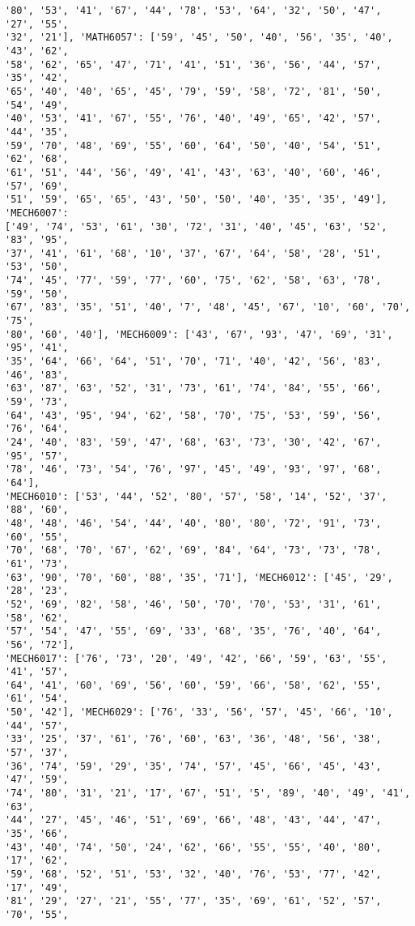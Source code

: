 \documentclass[11pt]{article}
\begin{document}
\begin{Verbatim}[commandchars=\\\{\}]
'80', '53', '41', '67', '44', '78', '53', '64', '32', '50', '47', '27', '55',
'32', '21'], 'MATH6057': ['59', '45', '50', '40', '56', '35', '40', '43', '62',
'58', '62', '65', '47', '71', '41', '51', '36', '56', '44', '57', '35', '42',
'65', '40', '40', '65', '45', '79', '59', '58', '72', '81', '50', '54', '49',
'40', '53', '41', '67', '55', '76', '40', '49', '65', '42', '57', '44', '35',
'59', '70', '48', '69', '55', '60', '64', '50', '40', '54', '51', '62', '68',
'61', '51', '44', '56', '49', '41', '43', '63', '40', '60', '46', '57', '69',
'51', '59', '65', '65', '43', '50', '50', '40', '35', '35', '49'], 'MECH6007':
['49', '74', '53', '61', '30', '72', '31', '40', '45', '63', '52', '83', '95',
'37', '41', '61', '68', '10', '37', '67', '64', '58', '28', '51', '53', '50',
'74', '45', '77', '59', '77', '60', '75', '62', '58', '63', '78', '59', '50',
'67', '83', '35', '51', '40', '7', '48', '45', '67', '10', '60', '70', '75',
'80', '60', '40'], 'MECH6009': ['43', '67', '93', '47', '69', '31', '95', '41',
'35', '64', '66', '64', '51', '70', '71', '40', '42', '56', '83', '46', '83',
'63', '87', '63', '52', '31', '73', '61', '74', '84', '55', '66', '59', '73',
'64', '43', '95', '94', '62', '58', '70', '75', '53', '59', '56', '76', '64',
'24', '40', '83', '59', '47', '68', '63', '73', '30', '42', '67', '95', '57',
'78', '46', '73', '54', '76', '97', '45', '49', '93', '97', '68', '64'],
'MECH6010': ['53', '44', '52', '80', '57', '58', '14', '52', '37', '88', '60',
'48', '48', '46', '54', '44', '40', '80', '80', '72', '91', '73', '60', '55',
'70', '68', '70', '67', '62', '69', '84', '64', '73', '73', '78', '61', '73',
'63', '90', '70', '60', '88', '35', '71'], 'MECH6012': ['45', '29', '28', '23',
'52', '69', '82', '58', '46', '50', '70', '70', '53', '31', '61', '58', '62',
'57', '54', '47', '55', '69', '33', '68', '35', '76', '40', '64', '56', '72'],
'MECH6017': ['76', '73', '20', '49', '42', '66', '59', '63', '55', '41', '57',
'64', '41', '60', '69', '56', '60', '59', '66', '58', '62', '55', '61', '54',
'50', '42'], 'MECH6029': ['76', '33', '56', '57', '45', '66', '10', '44', '57',
'33', '25', '37', '61', '76', '60', '63', '36', '48', '56', '38', '57', '37',
'36', '74', '59', '29', '35', '74', '57', '45', '66', '45', '43', '47', '59',
'74', '80', '31', '21', '17', '67', '51', '5', '89', '40', '49', '41', '63',
'44', '27', '45', '46', '51', '69', '66', '48', '43', '44', '47', '35', '66',
'43', '40', '74', '50', '24', '62', '66', '55', '55', '40', '80', '17', '62',
'59', '68', '52', '51', '53', '32', '40', '76', '53', '77', '42', '17', '49',
'81', '29', '27', '21', '55', '77', '35', '69', '61', '52', '57', '70', '55',

\end{Verbatim}
\end{document}
